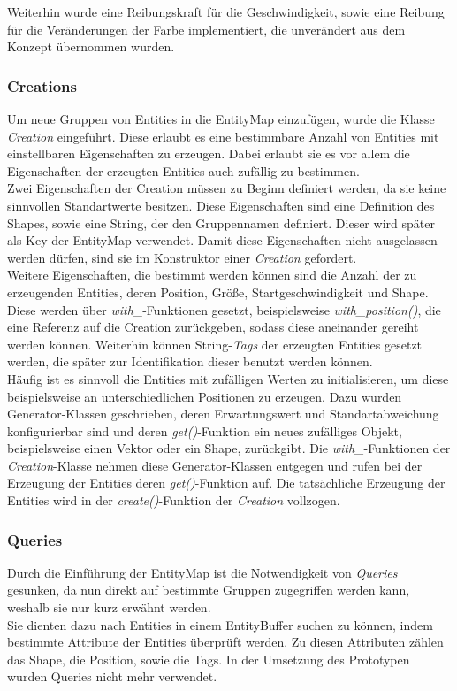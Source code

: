 \documentclass[11pt,a4paper]{article}
\begin{document}
\noindent
Weiterhin wurde eine Reibungskraft für die Geschwindigkeit, sowie eine Reibung für die Veränderungen der Farbe implementiert, die unverändert aus dem Konzept übernommen wurden.

\newpage

\subsubsection{Creations}
Um neue Gruppen von Entities in die EntityMap einzufügen, wurde die Klasse \textit{Creation} eingeführt. Diese erlaubt es eine bestimmbare Anzahl von Entities mit einstellbaren Eigenschaften zu erzeugen. Dabei erlaubt sie es vor allem die Eigenschaften der erzeugten Entities auch zufällig zu bestimmen.\\
Zwei Eigenschaften der Creation müssen zu Beginn definiert werden, da sie keine sinnvollen Standartwerte besitzen. Diese Eigenschaften sind eine Definition des Shapes, sowie eine String, der den Gruppennamen definiert. Dieser wird später als Key der EntityMap verwendet. Damit diese Eigenschaften nicht ausgelassen werden dürfen, sind sie im Konstruktor einer \textit{Creation} gefordert.\\
Weitere Eigenschaften, die bestimmt werden können sind die Anzahl der zu erzeugenden Entities, deren Position, Größe, Startgeschwindigkeit und Shape. Diese werden über \textit{with\_}-Funktionen gesetzt, beispielsweise \textit{with\_position()}, die eine Referenz auf die Creation zurückgeben, sodass diese aneinander gereiht werden können. Weiterhin können String-\textit{Tags} der erzeugten Entities gesetzt werden, die später zur Identifikation dieser benutzt werden können.\\
Häufig ist es sinnvoll die Entities mit zufälligen Werten zu initialisieren, um diese beispielsweise an unterschiedlichen Positionen zu erzeugen. Dazu wurden Generator-Klassen geschrieben, deren Erwartungswert und Standartabweichung konfigurierbar sind und deren \textit{get()}-Funktion ein neues zufälliges Objekt, beispielsweise einen Vektor oder ein Shape, zurückgibt. Die \textit{with\_}-Funktionen der \textit{Creation}-Klasse nehmen diese Generator-Klassen entgegen und rufen bei der Erzeugung der Entities deren \textit{get()}-Funktion auf. Die tatsächliche Erzeugung der Entities wird in der \textit{create()}-Funktion der \textit{Creation} vollzogen.

\subsubsection{Queries}
Durch die Einführung der EntityMap ist die Notwendigkeit von \textit{Queries} gesunken, da nun direkt auf bestimmte Gruppen zugegriffen werden kann, weshalb sie nur kurz erwähnt werden.\\
Sie dienten dazu nach Entities in einem EntityBuffer suchen zu können, indem bestimmte Attribute der Entities überprüft werden. Zu diesen Attributen zählen das Shape, die Position, sowie die Tags. In der Umsetzung des Prototypen wurden Queries nicht mehr verwendet.
\end{document}
